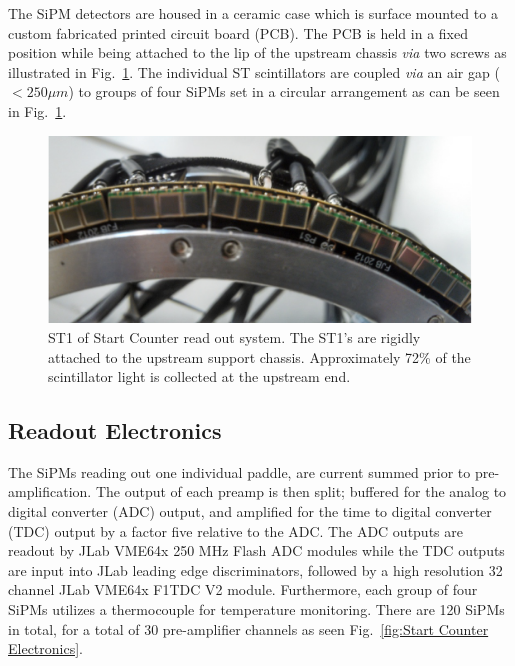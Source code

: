 The SiPM detectors are housed in a ceramic case which is surface mounted to a custom fabricated printed circuit board (PCB).  The PCB is held in a fixed position while being attached to the lip of the upstream chassis \emph{via} two screws as illustrated in Fig.~\ref{fig:st1_mounted}.  The individual ST scintillators are coupled \emph{via} an air gap ($< 250 \mu m$) to groups of four SiPMs set in a circular arrangement as can be seen in Fig.~\ref{fig:st1_mounted}.
	\begin{figure}[!htb]
		\centering
		\includegraphics[width=1.0\columnwidth]{design/figs/st1_mounted}
		\caption{ST1 of Start Counter read out system. The ST1's are rigidly attached to the upstream support chassis.  Approximately 72\% of the scintillator light is collected at the upstream end.}
		\label{fig:st1_mounted}
	\end{figure}

\subsection{Readout Electronics} \label{sec:design_electronics}

The SiPMs reading out one individual paddle, are current summed prior to pre-amplification.  The output of each preamp is then split; buffered for the analog to digital converter (ADC) output, and amplified for the time to digital converter (TDC) output by a factor five relative to the ADC.  The ADC outputs are readout by JLab VME64x 250 MHz Flash ADC modules while the TDC outputs are input into JLab leading edge discriminators, followed by a high resolution 32 channel JLab VME64x F1TDC V2 module.  Furthermore, each group of four SiPMs utilizes a thermocouple for temperature monitoring. There are 120 SiPMs in total, for a total of 30 pre-amplifier channels as seen Fig.~\ref{fig:Start Counter Electronics}.


